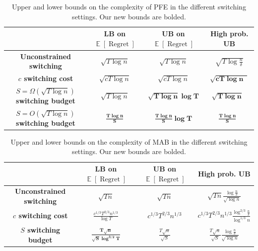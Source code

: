 \documentclass[final,12pt]{colt2018}
\DeclareMathOperator{\E}{\mathbb{E}}
\DeclareMathOperator{\logdel}{\log\tfrac{1}{\delta}}
\DeclareMathOperator{\Regret}{\text{Regret}}
\begin{document}
\begin{table}[H]
\centering
\vspace{-0.5mm}
\caption{Upper and lower bounds on the complexity of PFE in the different switching settings. Our new bounds are bolded.}
\vspace*{2mm}
\label{table:pfe}
\begin{tabular}{|c|c|c|c|}
\hline
          & \textbf{LB on $\E[\Regret]$} & \textbf{UB on $\E[\Regret]$} & \textbf{High prob. UB} \\ \hline
\textbf{Unconstrained switching} & $\sqrt{T \log n}$  & $\sqrt{T \log n}$ & $\sqrt{T \log \tfrac{n}{\delta}}$ \\ \hline
\textbf{$c$ switching cost}      & $\sqrt{cT \log n}$ & $\sqrt{c T \log n}$ &     $\pmb{\sqrt{cT \log n \logdel}}$ \\ \hline
\textbf{$S=\Omega(\sqrt{T \log n})$ switching budget}& $\sqrt{T \log n}$& $\pmb{\sqrt{T \log n} \log T}$  & $\pmb{\sqrt{T \log n} \logdel}$   \\ \hline
\textbf{$S=O(\sqrt{T \log n})$ switching budget}& $\pmb{\frac{T \log n}{S}}$ & $\pmb{\frac{T \log n}{S}\log T}$ & $\pmb{\frac{T\log n}{S}\logdel}$ \\ \hline
\end{tabular}
\end{table}

\begin{table}[H]
\centering
\vspace{-2mm}
\caption{Upper and lower bounds on the complexity of MAB in the different switching settings. Our new bounds are bolded.}
\vspace*{2mm}
\label{table:mab}
\begin{tabular}{|c|c|c|c|}
\hline
 & \textbf{LB on $\E[\Regret]$} & \textbf{UB on $\E[\Regret]$} & \textbf{High prob. UB} \\ \hline
\textbf{Unconstrained switching} & $\sqrt{Tn}$& $\sqrt{Tn}$ & $\sqrt{Tn} \frac{\log \frac{n}{\delta}}{\sqrt{\log n}}$ \\ \hline
\textbf{$c$ switching cost}      &
$\frac{c^{1/3}T^{2/3}n^{1/3}}{\log T}$ & $c^{1/3}T^{2/3}n^{1/3}$ & $c^{1/3}T^{2/3}n^{1/3} \frac{\log^{2/3} \frac{n}{\delta}}{\log^{1/3} n}$ \\ \hline
\textbf{$S$ switching budget}& $\pmb{\frac{T\sqrt{n}}{\sqrt{S} \log^{3/2} T}}$ & ${\frac{T\sqrt{n}}{\sqrt{S}}}$  & ${\frac{T\sqrt{n}}{\sqrt{S}} \frac{\log\frac{n}{\delta}}{\sqrt{\log n}}}$  \\ \hline
\end{tabular}
\end{table}
\end{document}
